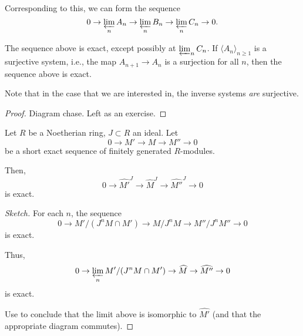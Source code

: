 \documentclass[12pt]{article}
\begin{document}
Corresponding to this, we can form the sequence
\begin{equation*} 
	0 \to \varprojlim_{n} A_{n} \to \varprojlim_{n} B_{n} \to \varprojlim_{n} C_{n} \to 0.
\end{equation*}

\begin{prop}
	The sequence above is exact, except possibly at $\varprojlim_{n} C_{n}$. \newline
	If $\langle A_{n} \rangle_{n \ge 1}$ is a surjective system, i.e., the map $A_{n + 1} \to A_{n}$ is a surjection for all $n$, then the sequence above is exact.
\end{prop}

Note that in the case that we are interested in, the inverse systems \emph{are} surjective. 

\begin{proof} 
	Diagram chase. Left as an exercise.
\end{proof}

\begin{thm}
	Let $R$ be a Noetherian ring, $J \subset R$ an ideal. Let 
	\begin{equation*} 
		0 \to M' \to M \to M'' \to 0
	\end{equation*}
	be a short exact sequence of finitely generated $R$-modules.

	Then, 
	\begin{equation*} 
		0 \to \widehat{M'}^{J} \to \widehat{M}^{J} \to \widehat{M''}^{J} \to 0
	\end{equation*}
	is exact.
\end{thm}
\begin{proof}[Sketch]
	For each $n$, the sequence 
	\begin{equation*} 
		0 \to M'/(J^{n} M \cap M') \to M/J^{n} M \to M''/J^{n} M'' \to 0
	\end{equation*}
	is exact.

	Thus, 
	\begin{equation*} 
		0 \to \varprojlim_{n} M'/(J^{n} M \cap M') \to \widehat{M} \to \widehat{M''} \to 0
	\end{equation*}
	is exact.

	Use  to conclude that the limit above is isomorphic to $\widehat{M'}$ (and that the appropriate diagram commutes).
\end{proof}
\end{document}
